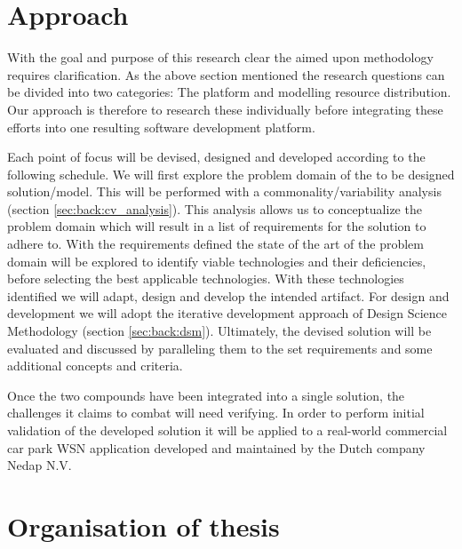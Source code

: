 \section{Approach}
With the goal and purpose of this research clear the aimed upon methodology requires clarification. As the above section mentioned the research questions can be divided into two categories: The platform and modelling resource distribution. Our approach is therefore to research these individually before integrating these efforts into one resulting software development platform. 

Each point of focus will be devised, designed and developed according to the following schedule. We will first explore the problem domain of the to be designed solution/model. This will be performed with a commonality/variability analysis (section \ref{sec:back:cv_analysis}). This analysis allows us to conceptualize the problem domain which will result in a list of requirements for the solution to adhere to. With the requirements defined the state of the art of the problem domain will be explored to identify viable technologies and their deficiencies, before selecting the best applicable technologies. With these technologies identified we will adapt, design and develop the intended artifact. For design and development we will adopt the iterative development approach of Design Science Methodology\cite{dsm} (section \ref{sec:back:dsm}). Ultimately, the devised solution will be evaluated and discussed by paralleling them to the set requirements and some additional concepts and criteria. 

Once the two compounds have been integrated into a single solution, the challenges it claims to combat will need verifying. In order to perform initial validation of the developed solution it will be applied to a real-world commercial car park WSN application developed and maintained by the Dutch company Nedap N.V.

\section{Organisation of thesis}
